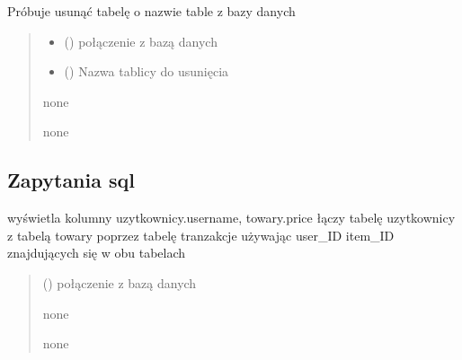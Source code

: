 \documentclass[letterpaper,10pt,polish]{sphinxmanual}
\begin{document}
\begin{fulllineitems}

\pysigstartsignatures
{}
\pysigstopsignatures
\sphinxAtStartPar
Próbuje usunąć tabelę o nazwie table z bazy danych
\begin{quote}\begin{description}
\begin{itemize}
\item {} 
\sphinxAtStartPar
{} () \textendash{} połączenie z bazą danych

\item {} 
\sphinxAtStartPar
{} () \textendash{} Nazwa tablicy do usunięcia

\end{itemize}

\sphinxAtStartPar
none

\sphinxAtStartPar
none

\end{description}\end{quote}

\end{fulllineitems}



\subsection{Zapytania sql}
\label{\detokenize{rozdzial4/index:id2}}

\begin{fulllineitems}

\pysigstartsignatures
{}
\pysigstopsignatures
\sphinxAtStartPar
wyświetla kolumny uzytkownicy.username, towary.price łączy tabelę uzytkownicy z tabelą towary poprzez tabelę tranzakcje używając user\_ID item\_ID znajdujących się w obu tabelach
\begin{quote}\begin{description}
\sphinxAtStartPar
{} () \textendash{} połączenie z bazą danych

\sphinxAtStartPar
none

\sphinxAtStartPar
none

\end{description}\end{quote}

\end{fulllineitems}
\end{document}
